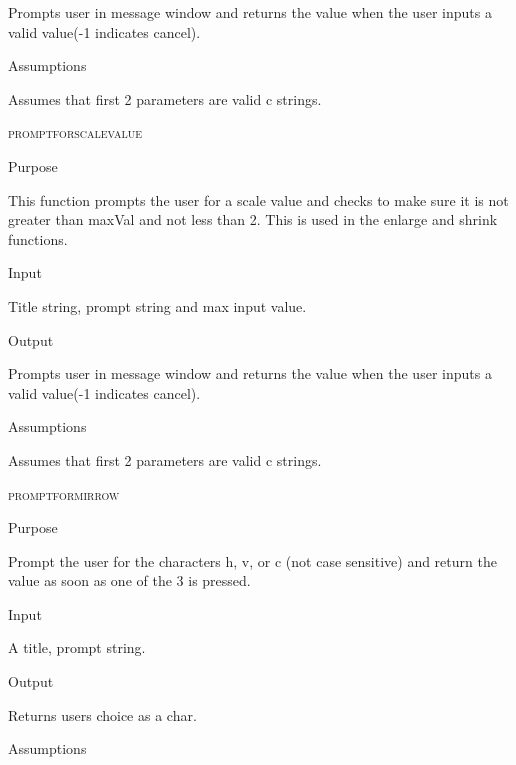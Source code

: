 \documentclass[pdftex, 11pt]{article}
\begin{document}
\begin{description}
\begin{description}
				Prompts user in message window and returns the value when
				the user inputs a valid value(-1 indicates cancel).

			\item{Assumptions}

				Assumes that first 2 parameters are valid c strings.

		\end{description}



	\item{\textsc{promptforscalevalue}}

		\begin{description}
			\item{Purpose}

				This function prompts the user for a scale value and checks to make sure it
				is not greater than maxVal and not less than 2.  This is used in the enlarge
				and shrink functions.

			\item{Input}

				Title string, prompt string and max input value.

			\item{Output}

				Prompts user in message window and returns the value when
				the user inputs a valid value(-1 indicates cancel).

			\item{Assumptions}

				Assumes that first 2 parameters are valid c strings.

		\end{description}


	\item{\textsc{promptformirrow}}

		\begin{description}
			\item{Purpose}

				Prompt the user for the characters h, v, or c (not case sensitive) and return
				the value as soon as one of the 3 is pressed.

			\item{Input}

				A title, prompt string.

			\item{Output}

				Returns users choice as a char.

			\item{Assumptions}


\end{description}
\end{description}
\end{document}
